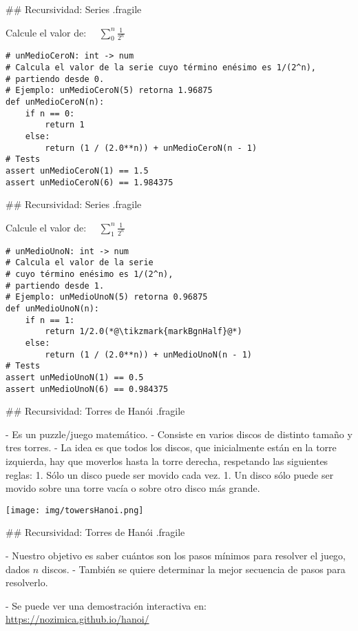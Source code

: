 ## Recursividad: Series {.fragile}

\bgnblockgood
{} Calcule el valor de: $\quad\sum\limits_{0}^n \frac{1}{2^n}$
\trmblockgood

\pause

\begin{small}
\begin{lstlisting}[style=frame02]
# unMedioCeroN: int -> num
# Calcula el valor de la serie cuyo término enésimo es 1/(2^n),
# partiendo desde 0.
# Ejemplo: unMedioCeroN(5) retorna 1.96875
def unMedioCeroN(n):
    if n == 0:
        return 1
    else:
        return (1 / (2.0**n)) + unMedioCeroN(n - 1)
# Tests
assert unMedioCeroN(1) == 1.5
assert unMedioCeroN(6) == 1.984375
\end{lstlisting}
\end{small}

## Recursividad: Series {.fragile}

\bgnblockgood
{} Calcule el valor de: $\quad\sum\limits_{1}^n \frac{1}{2^n}$
\trmblockgood

\pause

\begin{small}
\begin{lstlisting}[style=frame02]
# unMedioUnoN: int -> num
# Calcula el valor de la serie
# cuyo término enésimo es 1/(2^n),
# partiendo desde 1.
# Ejemplo: unMedioUnoN(5) retorna 0.96875
def unMedioUnoN(n):
    if n == 1:
        return 1/2.0(*@\tikzmark{markBgnHalf}@*)
    else:
        return (1 / (2.0**n)) + unMedioUnoN(n - 1)
# Tests
assert unMedioUnoN(1) == 0.5
assert unMedioUnoN(6) == 0.984375
\end{lstlisting}
\end{small}


## Recursividad: Torres de Hanói {.fragile}

- Es un puzzle/juego matemático.
- Consiste en varios discos de distinto tamaño y tres torres.
- La idea es que todos los discos, que inicialmente están en la torre
izquierda, hay que moverlos hasta la torre derecha, respetando las siguientes reglas:
    1. Sólo un disco puede ser movido cada vez.
    1. Un disco sólo puede ser movido sobre una torre vacía o sobre otro disco más grande.

\centering    \texttt{[image: img/towersHanoi.png]}

## Recursividad: Torres de Hanói {.fragile}

- Nuestro objetivo es saber cuántos son los pasos mínimos para resolver el juego, dados
$n$ discos.
- También se quiere determinar la mejor secuencia de pasos para resolverlo.

- Se puede ver una demostración interactiva en: \url{https://nozimica.github.io/hanoi/}


